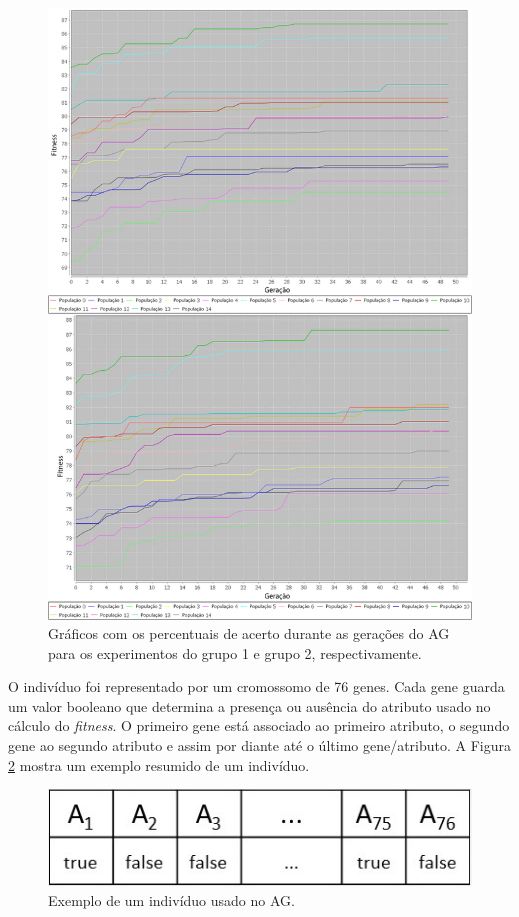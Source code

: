 \documentclass[conference]{IEEEtran}
\begin{document}
\begin{figure}
  \centering
  \includegraphics[scale=0.55]{grupo_1_e_grupo_2.png}
  \caption{Gráficos com os percentuais de acerto durante as gerações do AG para os experimentos do grupo 1 e grupo 2, respectivamente.}
  \label{figura:grupo_1_e_grupo_2}
\end{figure}

O indivíduo foi representado por um cromossomo de 76 genes. Cada gene guarda um valor booleano que determina a presença ou ausência do atributo usado no cálculo do \textit{fitness}. O primeiro gene está associado ao primeiro atributo, o segundo gene ao segundo atributo e assim por diante até o último gene/atributo. A Figura \ref{figura:individuo_do_ag} mostra um exemplo resumido de um indivíduo.

\begin{figure}
  \centering
  \includegraphics[scale=0.4]{individuo.jpg}
  \caption{Exemplo de um indivíduo usado no AG.}
  \label{figura:individuo_do_ag}
\end{figure}
\end{document}
